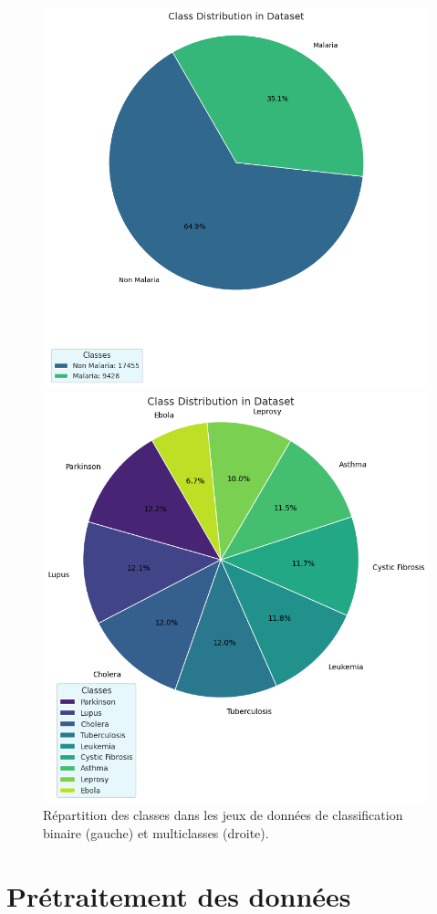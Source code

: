 \documentclass[12pt]{report}
\begin{document}
\begin{center}
\begin{figure}[H]
\centering
\begin{minipage}{0.48\textwidth}
  \includegraphics[width=0.65\linewidth]{binary_class_distribution.png}
\end{minipage}
\hfill
\begin{minipage}{0.48\textwidth}
  \includegraphics[width=0.65\linewidth]{multiclass_class_distribution.png}
\end{minipage}
\caption{Répartition des classes dans les jeux de données de classification binaire (gauche) et multiclasses (droite).}
\label{fig:class_distributions}
\end{figure}
\end{center}

\section{Prétraitement des données}
\end{document}
